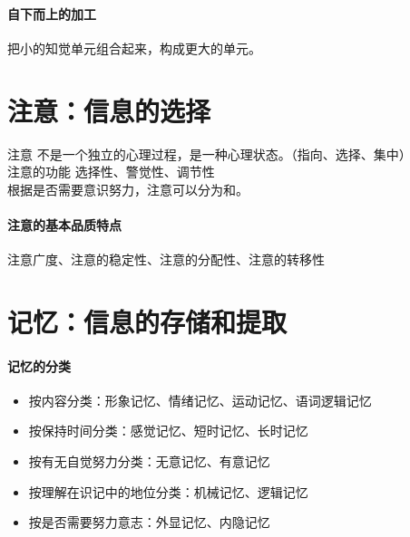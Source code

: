 \documentclass[b5paper,11pt]{article}
\begin{document}
\paragraph{自下而上的加工} 把小的知觉单元组合起来，构成更大的单元。

\psplit

\section{注意：信息的选择}

\noindent
\textcolor{ctp-red}{注意} 不是一个独立的心理过程，是一种心理状态。（指向、选择、集中） \\
\textcolor{ctp-red}{注意的功能} 选择性、警觉性、调节性 \\
根据是否需要\textcolor{ctp-red}{意识努力}，注意可以分为和。

\paragraph{注意的基本品质特点} 注意广度、注意的稳定性、注意的分配性、注意的转移性

\section{记忆：信息的存储和提取}
\paragraph{记忆的分类}

\begin{itemize}
  \item [-] 按内容分类：形象记忆、情绪记忆、运动记忆、语词逻辑记忆
  \item [-] 按保持时间分类：感觉记忆、短时记忆、长时记忆
  \item [-] 按有无自觉努力分类：无意记忆、有意记忆
  \item [-] 按理解在识记中的地位分类：机械记忆、逻辑记忆
  \item [-] 按是否需要努力意志：外显记忆、内隐记忆
\end{itemize}
\end{document}
